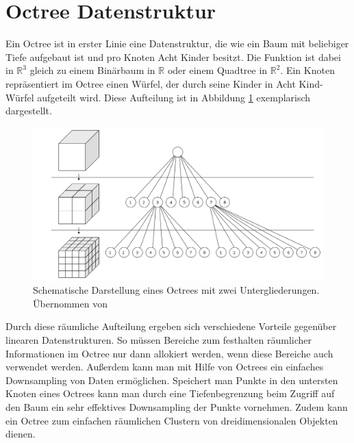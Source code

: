 \section{Octree Datenstruktur}

Ein Octree ist in erster Linie eine Datenstruktur, die wie ein Baum mit beliebiger Tiefe aufgebaut ist und pro Knoten Acht Kinder besitzt. Die Funktion ist dabei in \(\mathbb{R}^3\) gleich zu einem Binärbaum in \(\mathbb{R}\) oder einem Quadtree in \(\mathbb{R}^2\). Ein Knoten repräsentiert im Octree einen Würfel, der durch seine Kinder in Acht Kind-Würfel aufgeteilt wird. Diese Aufteilung ist in Abbildung \ref{fig:octree} exemplarisch dargestellt.

\begin{figure}[h]
  \centering
	\includegraphics[width=1.0\textwidth]{content/images/theory/octree.png} 
  \caption{Schematische Darstellung eines Octrees mit zwei Untergliederungen. Übernommen von \citet{dumusc2011multi}}
  \label{fig:octree}
\end{figure}

Durch diese räumliche Aufteilung ergeben sich verschiedene Vorteile gegenüber linearen Datenstrukturen. So müssen Bereiche zum festhalten räumlicher Informationen im Octree nur dann allokiert werden, wenn diese Bereiche auch verwendet werden. Außerdem kann man mit Hilfe von Octrees ein einfaches Downsampling von Daten ermöglichen. Speichert man Punkte in den untersten Knoten eines Octrees kann man durch eine Tiefenbegrenzung beim Zugriff auf den Baum ein sehr effektives Downsampling der Punkte vornehmen. Zudem kann ein Octree zum einfachen räumlichen Clustern von dreidimensionalen Objekten dienen.